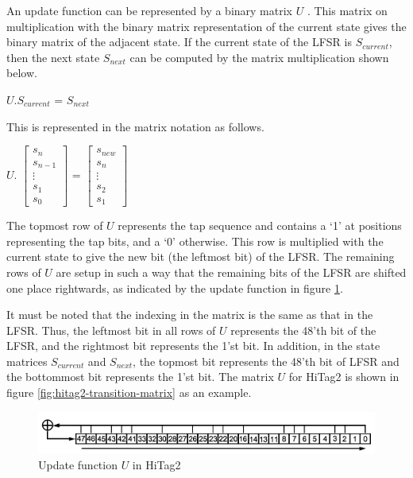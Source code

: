An update function can be represented by a binary matrix $U$ \cite{trappe2005icc}. This matrix on multiplication with the binary matrix representation of the current state gives the binary matrix of the adjacent state. If the current state of the LFSR is $S_{current}$, then the next state $S_{next}$ can be computed by the matrix multiplication shown below.
\begin{center}
$U . S_{current}$ = $S_{next}$\\
\end{center}
This is represented in the matrix notation as follows.
\begin{center}
$U.$
$\begin{bmatrix}
s_{n} \\
s_{n-1} \\
\vdots \\
s_{1} \\
s_{0}
\end{bmatrix}$ = 
$\begin{bmatrix}
s_{new} \\
s_{n} \\
\vdots \\
s_{2} \\
s_{1}
\end{bmatrix}$
\end{center}
The topmost row of $U$ represents the tap sequence and contains a `1' at positions representing the tap bits, and a `0' otherwise. This row is multiplied with the current state to give the new bit (the leftmost bit) of the LFSR. The remaining rows of $U$ are setup in such a way that the remaining bits of the LFSR are shifted one place rightwards, as indicated by the update function in figure \ref{fig:hitag2-update-function}. 

It must be noted that the indexing in the matrix is the same as that in the LFSR. Thus, the leftmost bit in all rows of $U$ represents the 48'th bit of the LFSR, and the rightmost bit represents the 1'st bit. In addition, in the state matrices $S_{current}$ and $S_{next}$, the topmost bit represents the 48'th bit of LFSR and the bottommost bit represents the 1'st bit. The matrix $U$ for HiTag2 is shown in figure \ref{fig:hitag2-transition-matrix} as an example. 

\begin{figure}[h!]
	\centering
	\includegraphics[width=5in]{./figures/hitag2-update-function.png}
	\caption{Update function $U$ in HiTag2}	
	\label{fig:hitag2-update-function}
\end{figure}

